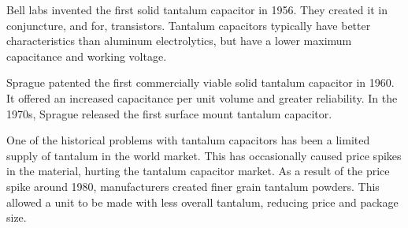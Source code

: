 \noindent Bell labs invented the first solid tantalum capacitor in 1956. They created it in conjuncture, and for, transistors.\cite[f.~56-64]{dumInv} Tantalum capacitors typically have better characteristics than aluminum electrolytics, but have a lower maximum capacitance and working voltage.\cite{learn_caps}

\noindent Sprague patented the first commercially viable solid tantalum capacitor in 1960. It offered an increased capacitance per unit volume and greater reliability.\cite{charTant} In the 1970s, Sprague released the first surface mount tantalum capacitor.\cite{spragueHist}

\noindent One of the historical problems with tantalum capacitors has been a limited supply of tantalum in the world market. This has occasionally caused price spikes in the material, hurting the tantalum capacitor market. As a result of the price spike around 1980, manufacturers created finer grain tantalum powders. This allowed a unit to be made with less overall tantalum, reducing price and package size.\cite[ch~3.1]{tantMis}
